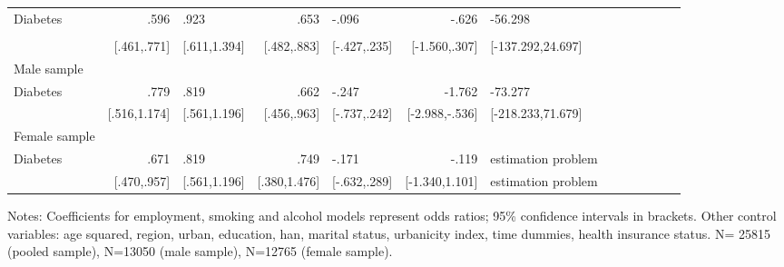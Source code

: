 \begin{table}[h]
\begin{adjustbox}{max width=\textwidth, center}
\begin{threeparttable}
{\begin{tabular}{l*{6}{D{.}{.}{-1}l}}
Diabetes        &        .596&            .923&            .653&       -.096&           -.626&         -56.298\\\\
                &     [.461,.771]&    [.611,1.394]&     [.482,.883]&  [-.427,.235]&   [-1.560,.307]&[-137.292,24.697]\\
\midrule
Male sample &&&&&&\\
Diabetes        &                .779&            .819&            .662&           -.247&          -1.762&         -73.277\\
                &   [.516,1.174]&    [.561,1.196]&     [.456,.963]&   [-.737,.242]&  [-2.988,-.536]&[-218.233,71.679]\\
\midrule
Female sample &&&&&&\\
Diabetes        &          .671&            .819&            .749&   -.171&           -.119&          estimation problem\\
                &   [.470,.957]&    [.561,1.196]&    [.380,1.476]& [-.632,.289]&  [-1.340,1.101]& estimation problem\\                
\bottomrule
\end{tabular}
\begin{tablenotes}
\item Notes: Coefficients for employment, smoking and alcohol models represent odds ratios;  95\% confidence intervals in brackets.
Other control variables: age squared, region, urban, education, han, marital status, urbanicity index, time dummies, health insurance status. N= 25815 (pooled sample), N=13050 (male sample), N=12765 (female sample).
\end{tablenotes}
}
\end{threeparttable}
\end{adjustbox}
\end{table}


